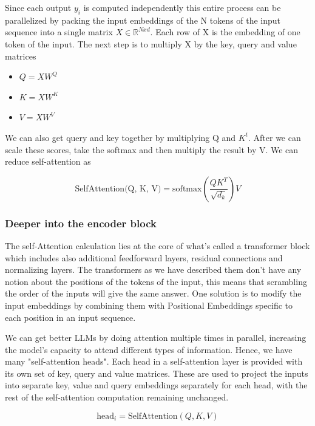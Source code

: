 \vspace{10pt}

Since each output $y_i$ is computed independently this entire process can be parallelized by packing the input embeddings of the N tokens of the input sequence into a single matrix $X \in \mathbb{R}^{Nxd}$. Each row of X is the embedding of one token of the input. The next step is to multiply X by the key, query and value matrices 

\begin{itemize}
    \item $Q = XW^Q$
    \item $K = XW^K$
    \item $V = XW^V$
\end{itemize}

We can also get query and key together by multiplying Q and $K^t$. After we can scale these scores, take the softmax and then multiply the result by V. We can reduce self-attention as 

\[
\text{SelfAttention(Q, K, V)} = \text{softmax}(\frac{QK^T}{\sqrt{d_k}})V
\]

\subsubsection{Deeper into the encoder block}

The self-Attention calculation lies at the core of what's called a transformer block which includes also additional feedforward layers, residual connections and normalizing layers. The transformers as we have described them don't have any notion about the positions of the tokens of the input, this means that scrambling the order of the inputs will give the same answer. One solution is to modify the input embeddings by combining them with Positional Embeddings specific to each position in an input sequence. 

\vspace{10pt}

We can get better LLMs by doing attention multiple times in parallel, increasing the model's capacity to attend different types of information. Hence, we have many "self-attention heads". Each head in a self-attention layer is provided with its own set of key, query and value matrices. These are used to project the inputs into separate key, value and query embeddings separately for each head, with the rest of the self-attention computation remaining unchanged.

\[
\text{head}_i = \text{SelfAttention}(Q, K, V)
\]

